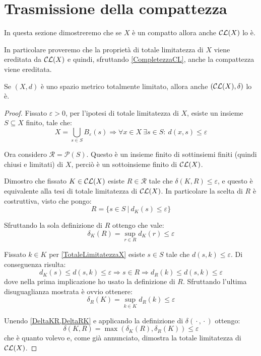 \section{Trasmissione della compattezza}
In questa sezione dimostreremo che se $X$ è un compatto allora anche $\mathcal{CL}(X)$ lo è. 

In particolare proveremo che la proprietà di totale limitatezza di $X$ viene ereditata da $\mathcal{CL}(X)$ e quindi, sfruttando \cref{CompletezzaCL}, anche la compattezza viene ereditata.

\begin{lemma}\label{TotaleLimitatezzaCL}
	Se $(X,d)$ è uno spazio metrico totalmente limitato, allora anche $(\mathcal{CL}(X),\delta)$ lo è.
\end{lemma}
\begin{proof}
	Fissato $\varepsilon>0$, per l'ipotesi di totale limitatezza di $X$, esiste un insieme $S\subseteq X$ finito, tale che:
	\begin{equation}\label{TotaleLimitatezzaX}
		X=\bigcup_{s\in S} B_{\varepsilon}(s) \Longrightarrow 
		\forall x\in X\ \exists s\in S:\ d(x,s)\le \varepsilon
	\end{equation}

	Ora considero $\mathcal{R}=\mathcal{P}(S)$. Questo è un insieme finito di sottinsiemi finiti (quindi chiusi e limitati) di $X$, perciò è un sottoinsieme finito di $\mathcal{CL}(X)$. 
	
	Dimostro che fissato $K\in\mathcal{CL}(X)$ esiste $R\in \mathcal{R}$ tale che $\delta(K,R)\le \varepsilon$, e questo è equivalente alla tesi di totale limitatezza di $\mathcal{CL}(X)$. In particolare la scelta di $R$ è costruttiva, visto che pongo:
	\begin{equation*}
		R=\{s\in S\ |\ d_K(s)\le \varepsilon\}
	\end{equation*}
	
	Sfruttando la sola definizione di $R$ ottengo che vale:
	\begin{equation}\label{DeltaKR}
		\delta_K(R)=\sup_{r\in R} d_K(r) \le \varepsilon
	\end{equation}
	
	Fissato $k\in K$ per \cref{TotaleLimitatezzaX} esiste $s\in S$ tale che $d(s,k)\le \varepsilon$. Di conseguenza risulta:
	\begin{equation*}
		d_K(s)\le d(s,k) \le \varepsilon \Longrightarrow s\in R \Longrightarrow d_R(k)\le d(s,k)\le \varepsilon
	\end{equation*}
	dove nella prima implicazione ho usato la definizione di $R$. 
	Sfruttando l'ultima disuguaglianza mostrata è ovvio ottenere:
	\begin{equation}\label{DeltaRK}
		\delta_R(K)=\sup_{k\in K} d_R(k) \le  \varepsilon
	\end{equation}
	
	Unendo \cref{DeltaKR,DeltaRK} e applicando la definizione di $\delta({}\cdot{},{}\cdot{})$ ottengo:
	\begin{equation*}
		\delta(K,R)=\max\left(\delta_K(R),\delta_R(K)\right)\le \varepsilon
	\end{equation*}
	che è quanto volevo e, come già annunciato, dimostra la totale limitatezza di $\mathcal{CL}(X)$.
\end{proof}

